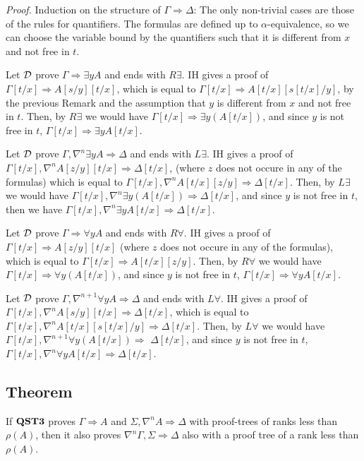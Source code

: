 \documentclass[a4paper, 12pt]{paper}
\begin{document}
\emph{Proof.} Induction on the structure of $\Gamma \Rightarrow \Delta$:
The only non-trivial cases are those of the rules for quantifiers. The formulas are defined up to $\alpha$-equivalence, so we can choose the variable bound by the quantifiers such that it is different from $x$ and not free in $t$.

Let $\mathcal{D}$ prove $\Gamma \Rightarrow \exists y A$ and ends with $R \exists$. IH gives a proof of $\Gamma[t/x] \Rightarrow A[s/y][t/x]$, which is equal to $\Gamma[t/x] \Rightarrow A[t/x][s[t/x]/y]$, by the previous Remark and the assumption that $y$ is different from $x$ and not free in $t$. Then, by $R \exists$ we would have $\Gamma[t/x] \Rightarrow \exists y (A[t/x])$, and since $y$ is not free in $t$, $\Gamma[t/x] \Rightarrow \exists y A [t/x]$.

Let $\mathcal{D}$ prove $\Gamma, \nabla^n \exists y A \Rightarrow \Delta$ and ends with $L \exists$. IH gives a proof of $\Gamma[t/x], \nabla^n A[z/y][t/x] \Rightarrow \Delta[t/x]$, (where $z$ does not occure in any of the formulas) which is equal to $\Gamma[t/x], \nabla^n A[t/x][z/y] \Rightarrow \Delta[t/x]$. Then, by $L \exists$ we would have $\Gamma[t/x], \nabla^n \exists y (A[t/x]) \Rightarrow \Delta[t/x]$, and since $y$ is not free in $t$, then we have $\Gamma[t/x], \nabla^n \exists y A [t/x] \Rightarrow \Delta[t/x]$.

Let $\mathcal{D}$ prove $\Gamma \Rightarrow \forall y A$ and ends with $R \forall$. IH gives a proof of $\Gamma[t/x] \Rightarrow A[z/y][t/x]$ (where $z$ does not occure in any of the formulas), which is equal to $\Gamma[t/x] \Rightarrow A[t/x][z/y]$. Then, by $R \forall$ we would have $\Gamma[t/x] \Rightarrow \forall y (A[t/x])$, and since $y$ is not free in $t$, $\Gamma[t/x] \Rightarrow \forall y A [t/x]$.

Let $\mathcal{D}$ prove $\Gamma, \nabla^{n+1} \forall y A \Rightarrow \Delta$ and ends with $L \forall$. IH gives a proof of $\Gamma[t/x], \nabla^n A[s/y][t/x] \Rightarrow \Delta[t/x]$, which is equal to $\Gamma[t/x], \nabla^n A[t/x][s[t/x]/y] \Rightarrow \Delta[t/x]$. Then, by $L \forall$ we would have $\Gamma[t/x], \nabla^{n+1} \forall y (A[t/x]) \Rightarrow$ $\Delta[t/x]$, and since $y$ is not free in $t$, $\Gamma[t/x], \nabla^n \forall y A [t/x] \Rightarrow \Delta[t/x]$.



\subsection{Theorem} If $\mathbf{QST3}$ proves $\Gamma \Rightarrow A$ and $\Sigma , \nabla^n A \Rightarrow \Delta$ with proof-trees of ranks less than $\rho(A)$, then it also proves $\nabla^n \Gamma, \Sigma \Rightarrow \Delta$ also with a proof tree of a rank less than $\rho(A)$.
\end{document}

